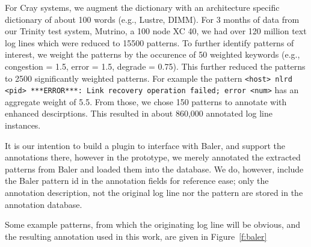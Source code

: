 For Cray systems, we augment
the dictionary with an architecture specific dictionary of about 100 words (e.g., Lustre, DIMM).
For 3 months of data from our Trinity test system, Mutrino, a 100 node XC 40,
we had over 120 million text log lines which were reduced to 15500 patterns. To further identify patterns
of interest, we weight the patterns by the occurence of 50 weighted
keywords (e.g., congestion = 1.5, error = 1.5, degrade = 0.75). This further reduced the patterns
to 2500 significantly weighted patterns. For example the pattern
\texttt{<host> nlrd <pid> ***ERROR***: Link recovery operation failed; error <num>} has
an aggregate weight of 5.5. From those, we chose 150
patterns to annotate with enhanced descirptions. This resulted in about 860,000
annotated log line instances.

It is our intention to
build a plugin to interface with Baler, and support the annotations there,
however in the prototype, we merely annotated the extracted patterns from
Baler and loaded them into the database.
We do, however, include the Baler pattern id in the annotation fields
for reference ease; only the annotation description, not the original log line nor the pattern
are stored in the annotation database.

Some example patterns, from which the originating log line will be obvious, and
the resulting annotation used in this work, are given in Figure~\ref{f:baler}

